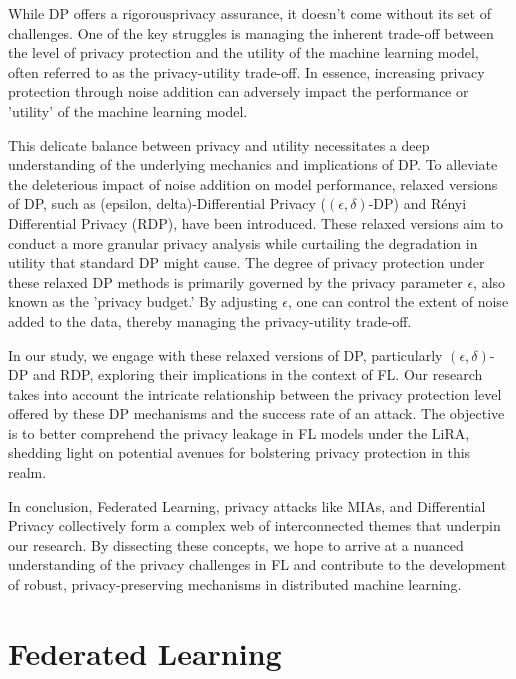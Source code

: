 While DP offers a rigorousprivacy assurance, it doesn't come without its set of challenges. One of the key struggles is managing the inherent trade-off between the level of privacy protection and the utility of the machine learning model, often referred to as the privacy-utility trade-off. In essence, increasing privacy protection through noise addition can adversely impact the performance or 'utility' of the machine learning model.

This delicate balance between privacy and utility necessitates a deep understanding of the underlying mechanics and implications of DP. To alleviate the deleterious impact of noise addition on model performance, relaxed versions of DP, such as (epsilon, delta)-Differential Privacy ($(\epsilon, \delta)$-DP) and Rényi Differential Privacy (RDP), have been introduced. These relaxed versions aim to conduct a more granular privacy analysis while curtailing the degradation in utility that standard DP might cause. The degree of privacy protection under these relaxed DP methods is primarily governed by the privacy parameter $\epsilon$, also known as the 'privacy budget.' By adjusting $\epsilon$, one can control the extent of noise added to the data, thereby managing the privacy-utility trade-off.

In our study, we engage with these relaxed versions of DP, particularly $(\epsilon, \delta)$-DP and RDP, exploring their implications in the context of FL. Our research takes into account the intricate relationship between the privacy protection level offered by these DP mechanisms and the success rate of an attack. The objective is to better comprehend the privacy leakage in FL models under the LiRA, shedding light on potential avenues for bolstering privacy protection in this realm.

In conclusion, Federated Learning, privacy attacks like MIAs, and Differential Privacy collectively form a complex web of interconnected themes that underpin our research. By dissecting these concepts, we hope to arrive at a nuanced understanding of the privacy challenges in FL and contribute to the development of robust, privacy-preserving mechanisms in distributed machine learning.


\section{Federated Learning}
\label{sec:fl}

